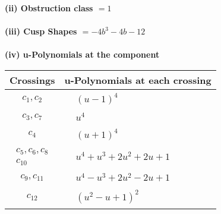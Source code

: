 \documentclass[1p]{elsarticle_modified}
\theoremstyle{definition}
\begin{document}
\flushleft \textbf{(ii) Obstruction class $= 1$}\\~\\
\flushleft \textbf{(iii) Cusp Shapes $= -4 b^3-4 b-12$}\\~\\
\newpage\renewcommand{\arraystretch}{1}
\flushleft \textbf{(iv) u-Polynomials at the component}\newline \\
\begin{tabular}{m{50pt}|m{274pt}}
Crossings & \hspace{64pt}u-Polynomials at each crossing \\
\hline $$\begin{aligned}c_{1},c_{2}\end{aligned}$$&$\begin{aligned}
&(u-1)^4
\end{aligned}$\\
\hline $$\begin{aligned}c_{3},c_{7}\end{aligned}$$&$\begin{aligned}
&u^4
\end{aligned}$\\
\hline $$\begin{aligned}c_{4}\end{aligned}$$&$\begin{aligned}
&(u+1)^4
\end{aligned}$\\
\hline $$\begin{aligned}c_{5},c_{6},c_{8}\\c_{10}\end{aligned}$$&$\begin{aligned}
&u^4+u^3+2 u^2+2 u+1
\end{aligned}$\\
\hline $$\begin{aligned}c_{9},c_{11}\end{aligned}$$&$\begin{aligned}
&u^4- u^3+2 u^2-2 u+1
\end{aligned}$\\
\hline $$\begin{aligned}c_{12}\end{aligned}$$&$\begin{aligned}
&(u^2- u+1)^2
\end{aligned}$\\
\hline
\end{tabular}\\~\\
\end{document}
